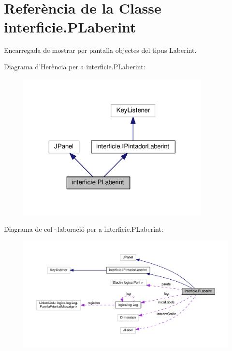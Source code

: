 \hypertarget{classinterficie_1_1_p_laberint}{\section{Referència de la Classe interficie.\+P\+Laberint}
\label{classinterficie_1_1_p_laberint}
}


Encarregada de mostrar per pantalla objectes del tipus Laberint.  




Diagrama d'Herència per a interficie.\+P\+Laberint\+:
\nopagebreak
\begin{figure}[H]
\begin{center}
\leavevmode
\includegraphics[width=276pt]{classinterficie_1_1_p_laberint__inherit__graph}
\end{center}
\end{figure}


Diagrama de col·laboració per a interficie.\+P\+Laberint\+:
\nopagebreak
\begin{figure}[H]
\begin{center}
\leavevmode
\includegraphics[width=350pt]{classinterficie_1_1_p_laberint__coll__graph}
\end{center}
\end{figure}
